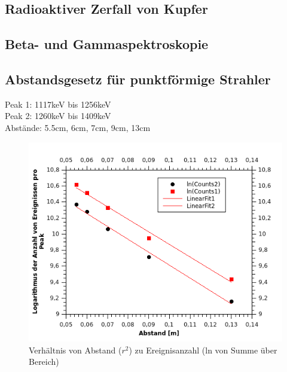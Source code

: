 \documentclass[12pt,a4paper]{article}
\begin{document}
\begin{multicols}{2}
\subsection{Radioaktiver Zerfall von Kupfer}

\subsection{Beta- und Gammaspektroskopie}

\subsection{Abstandsgesetz für punktförmige Strahler}

Peak 1: 1117keV bis 1256keV\\
Peak 2: 1260keV bis 1409keV\\
Abstände: 5.5cm, 6cm, 7cm, 9cm, 13cm\\
\begin{figure}[H]
	\centering
	\includegraphics[scale=1.5]{./figures/Endergebniss_Abstand_mitFits.png}
	\caption{Verhältnis von Abstand ($r^2$) zu Ereignisanzahl (ln von Summe über Bereich)}
	\label{fig:abstandsgesetz_erg}
\end{figure}


\end{multicols}
\end{document}
